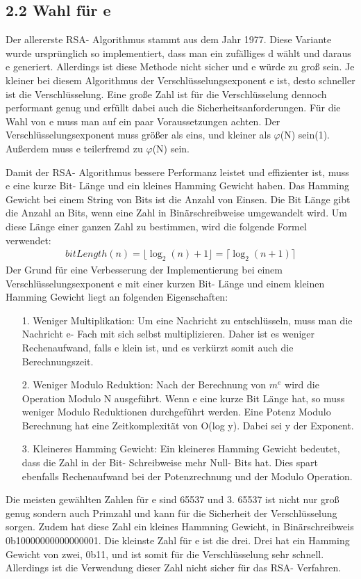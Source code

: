 \documentclass[course=asp]{aspdoc}
\begin{document}
\subsection*{2.2 Wahl für e }
Der allererste RSA- Algorithmus stammt aus dem Jahr 1977. Diese Variante wurde ursprünglich so implementiert, dass man ein zufälliges d wählt und daraus e generiert. Allerdings ist diese Methode nicht sicher und e würde zu groß sein. Je kleiner bei diesem Algorithmus der Verschlüsselungsexponent e ist, desto schneller ist die Verschlüsselung. Eine große Zahl ist für die Verschlüsselung dennoch performant genug und erfüllt dabei auch die Sicherheitsanforderungen. Für die Wahl von e muss man auf ein paar Voraussetzungen achten. Der Verschlüsselungsexponent muss größer als eins, und kleiner als $\varphi $(N) sein(1). Außerdem muss e teilerfremd zu $\varphi $(N) sein.

Damit der RSA- Algorithmus bessere Performanz leistet und effizienter ist, muss e eine kurze Bit- Länge und ein kleines Hamming Gewicht haben. Das Hamming Gewicht bei einem String von Bits ist die Anzahl von Einsen. Die Bit Länge gibt die Anzahl an Bits, wenn eine Zahl in Binärschreibweise umgewandelt wird. Um diese Länge einer ganzen Zahl zu bestimmen, wird die folgende Formel verwendet:
\begin{align}
	bitLength(n) = \lfloor \log_{2}(n) + 1 \rfloor = \lceil \log_{2}(n + 1)\rceil
\end{align}
Der Grund für eine Verbesserung der Implementierung bei einem Verschlüsselungsexponent e mit einer kurzen Bit- Länge und einem kleinen Hamming Gewicht liegt an folgenden Eigenschaften:
\begin{itemize}
 \item [1.] Weniger Multiplikation: Um eine Nachricht zu entschlüsseln, muss man die Nachricht e- Fach mit sich selbst multiplizieren. Daher ist es weniger Rechenaufwand, falls e klein ist, und es verkürzt somit auch die Berechnungszeit.
 \item [2.] Weniger Modulo Reduktion: Nach der Berechnung von $m^{e}$ wird die Operation Modulo N ausgeführt. Wenn e eine kurze Bit Länge hat, so muss weniger Modulo Reduktionen durchgeführt werden. Eine Potenz Modulo Berechnung hat eine Zeitkomplexität von O(log y). Dabei sei y der Exponent.   
 \item [3.] Kleineres Hamming Gewicht: Ein kleineres Hamming Gewicht bedeutet, dass die Zahl in der Bit- Schreibweise mehr Null- Bits hat. Dies spart ebenfalls Rechenaufwand bei der Potenzrechnung und der Modulo Operation.
\end{itemize}
Die meisten gewählten Zahlen für e sind 65537 und 3. 65537 ist nicht nur groß genug sondern auch Primzahl und kann für die Sicherheit der Verschlüsselung sorgen. Zudem hat diese Zahl ein kleines Hammning Gewicht, in Binärschreibweis 0b10000000000000001. Die kleinste Zahl für e ist die drei. Drei hat ein Hamming Gewicht von zwei, 0b11, und ist somit für die Verschlüsselung sehr schnell. Allerdings ist die Verwendung dieser Zahl nicht sicher für das RSA- Verfahren. %
\end{document}
